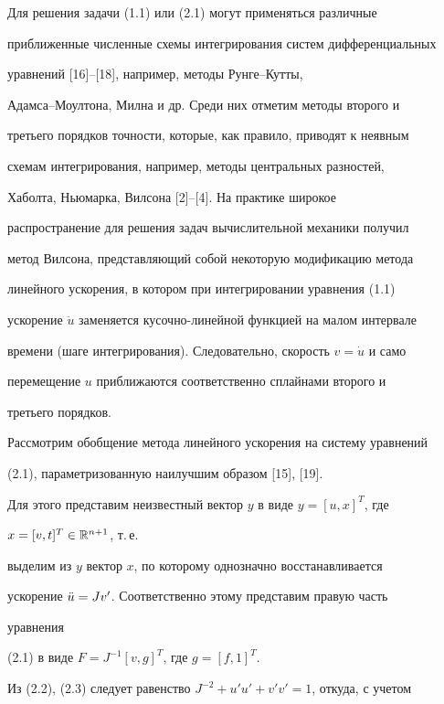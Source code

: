  


Для решения задачи (1.1) или (2.1) могут применяться различные 


приближенные численные схемы интегрирования систем дифференциальных 


уравнений [16]--[18], например, методы Рунге--Кутты, 


Адамса--Моултона, Милна и др. Среди них отметим методы второго и 


третьего порядков точности, которые, как правило, приводят к неявным 


схемам интегрирования, например, методы центральных разностей, 


Хаболта, Ньюмарка, Вилсона [2]--[4]. На практике широкое 


распространение для решения задач вычислительной механики получил 


метод Вилсона, представляющий собой некоторую модификацию метода 


линейного ускорения, в котором при интегрировании уравнения (1.1) 


ускорение $\ddot u$ заменяется кусочно-линейной функцией на малом интервале 


времени (шаге интегрирования). Следовательно, скорость $v=\Dot u$ и само 


перемещение $u$ приближаются соответственно сплайнами второго и 


третьего порядков. 


 


Рассмотрим обобщение метода линейного ускорения на систему уравнений 


(2.1), параметризованную наилучшим образом [15], [19]. 


 


Для этого представим неизвестный вектор $y$ в виде $y=[u,x]^T$, где 


$x=[v,t]^T\in\Bbb R^{n+1}$, т.\,е. 


выделим из $y$ вектор $x$, по которому однозначно восстанавливается 


ускорение $\Ddot u=Jv'$. Соответственно этому представим правую часть 


уравнения 


(2.1) в виде $F=J^{-1}[v,g]^T$, где $g=[f,1]^T$. 


 


Из (2.2), (2.3) следует равенство $J^{-2}+u'u'+v'v'=1$, откуда, с учетом 



